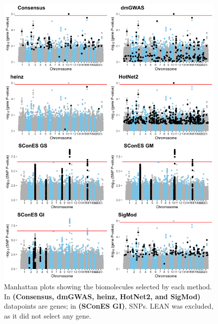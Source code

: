 \documentclass[twocolumn, 10pt]{article}
\begin{document}
\begin{figure}[htbp]
\centering
\includegraphics[width=.9\linewidth]{./figures/sfigure_3.png}
\caption{\label{sfig:manhattan_solutions}
Manhattan plots showing the biomolecules selected by each method. In \textbf{(Consensus, dmGWAS, heinz, HotNet2, and SigMod)} datapoints are genes; in \textbf{(SConES GI)}, SNPs. LEAN was excluded, as it did not select any gene.}
\end{figure}
\end{document}
